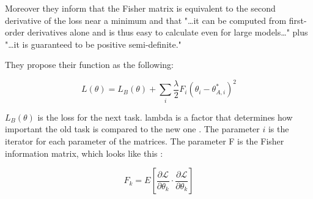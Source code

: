 Moreover they inform that the Fisher matrix is equivalent to the second derivative of the loss near a minimum and that "…it can be computed from first-order derivatives alone and is thus easy to calculate even for large models…" plus "…it is guaranteed to be positive semi-definite."
\cite{elastic-weight-consolidation}

They propose their function as the following:

$$L(\theta) = L_{B}(\theta) + \sum_{i} \frac{\lambda}{2} F_{i} (\theta_{i} - \theta_{A,i}^{*})^2 $$

$L_{B}(\theta)$ is the loss for the next task.
lambda is a factor that determines how important the old task is compared to the new one \cite{elastic-weight-consolidation}.
The parameter $i$ is the iterator for each parameter of the matrices.
The parameter F is the Fisher information matrix, which looks like this \cite{incrmental-moment-matching}:

$$F_k = E \left[ \frac{\partial \mathcal{L}}{\partial \theta_{k}} \cdot \frac{\partial \mathcal{L}}{\partial \theta_{k}} \right]$$

